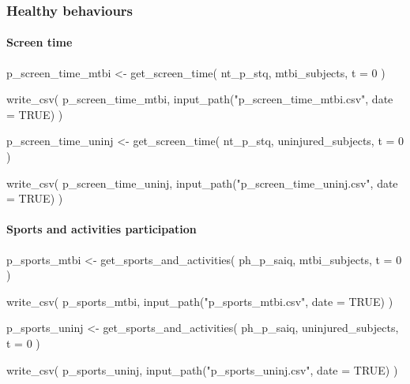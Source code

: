 \documentclass[
  letterpaper,
  DIV=11,
  numbers=noendperiod]{scrreprt}
\let\oldparagraph\paragraph
\renewcommand{\paragraph}[1]{\oldparagraph{#1}\mbox{}}
\newenvironment{Shaded}{\begin{snugshade}}{\end{snugshade}}
\newcommand{\AttributeTok}[1]{\textcolor[rgb]{0.40,0.45,0.13}{#1}}
\newcommand{\ConstantTok}[1]{\textcolor[rgb]{0.56,0.35,0.01}{#1}}
\newcommand{\DecValTok}[1]{\textcolor[rgb]{0.68,0.00,0.00}{#1}}
\newcommand{\FunctionTok}[1]{\textcolor[rgb]{0.28,0.35,0.67}{#1}}
\newcommand{\NormalTok}[1]{\textcolor[rgb]{0.00,0.23,0.31}{#1}}
\newcommand{\OtherTok}[1]{\textcolor[rgb]{0.00,0.23,0.31}{#1}}
\newcommand{\StringTok}[1]{\textcolor[rgb]{0.13,0.47,0.30}{#1}}
\begin{document}
\subsubsection{Healthy behaviours}\label{healthy-behaviours}

\paragraph{Screen time}\label{screen-time}

\begin{Shaded}
\begin{Highlighting}[]
\NormalTok{p\_screen\_time\_mtbi }\OtherTok{\textless{}{-}} \FunctionTok{get\_screen\_time}\NormalTok{(}
\NormalTok{    nt\_p\_stq,}
\NormalTok{    mtbi\_subjects,}
    \AttributeTok{t =} \DecValTok{0}
\NormalTok{)}

\FunctionTok{write\_csv}\NormalTok{(}
\NormalTok{    p\_screen\_time\_mtbi, }\FunctionTok{input\_path}\NormalTok{(}\StringTok{"p\_screen\_time\_mtbi.csv"}\NormalTok{, }\AttributeTok{date =} \ConstantTok{TRUE}\NormalTok{)}
\NormalTok{)}

\NormalTok{p\_screen\_time\_uninj }\OtherTok{\textless{}{-}} \FunctionTok{get\_screen\_time}\NormalTok{(}
\NormalTok{    nt\_p\_stq,}
\NormalTok{    uninjured\_subjects,}
    \AttributeTok{t =} \DecValTok{0}
\NormalTok{)}

\FunctionTok{write\_csv}\NormalTok{(}
\NormalTok{    p\_screen\_time\_uninj, }\FunctionTok{input\_path}\NormalTok{(}\StringTok{"p\_screen\_time\_uninj.csv"}\NormalTok{, }\AttributeTok{date =} \ConstantTok{TRUE}\NormalTok{)}
\NormalTok{)}
\end{Highlighting}
\end{Shaded}

\paragraph{Sports and activities
participation}\label{sports-and-activities-participation}

\begin{Shaded}
\begin{Highlighting}[]
\NormalTok{p\_sports\_mtbi }\OtherTok{\textless{}{-}} \FunctionTok{get\_sports\_and\_activities}\NormalTok{(}
\NormalTok{    ph\_p\_saiq,}
\NormalTok{    mtbi\_subjects,}
    \AttributeTok{t =} \DecValTok{0}
\NormalTok{)}

\FunctionTok{write\_csv}\NormalTok{(}
\NormalTok{    p\_sports\_mtbi, }\FunctionTok{input\_path}\NormalTok{(}\StringTok{"p\_sports\_mtbi.csv"}\NormalTok{, }\AttributeTok{date =} \ConstantTok{TRUE}\NormalTok{)}
\NormalTok{)}

\NormalTok{p\_sports\_uninj }\OtherTok{\textless{}{-}} \FunctionTok{get\_sports\_and\_activities}\NormalTok{(}
\NormalTok{    ph\_p\_saiq,}
\NormalTok{    uninjured\_subjects,}
    \AttributeTok{t =} \DecValTok{0}
\NormalTok{)}

\FunctionTok{write\_csv}\NormalTok{(}
\NormalTok{    p\_sports\_uninj, }\FunctionTok{input\_path}\NormalTok{(}\StringTok{"p\_sports\_uninj.csv"}\NormalTok{, }\AttributeTok{date =} \ConstantTok{TRUE}\NormalTok{)}
\NormalTok{)}
\end{Highlighting}
\end{Shaded}
\end{document}
